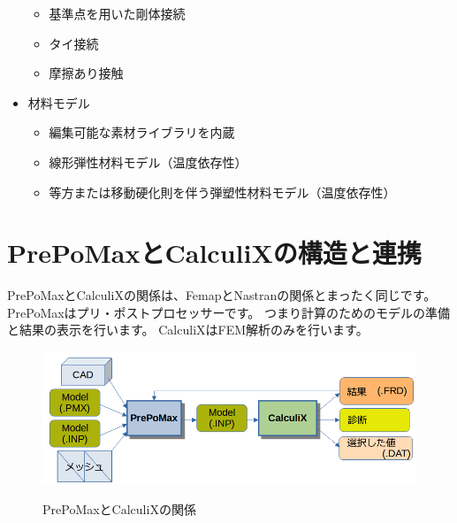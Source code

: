 \documentclass[a4j,20pt,slide]{ltjsarticle}
\begin{document}
\begin{itemize}
\begin{itemize}
		      \item 基準点を用いた剛体接続
		      \item タイ接続
		      \item 摩擦あり接触
	      \end{itemize}
	\item 材料モデル
	      \begin{itemize}
		      \item 編集可能な素材ライブラリを内蔵
		      \item 線形弾性材料モデル（温度依存性）
		      \item 等方または移動硬化則を伴う弾塑性材料モデル（温度依存性）
	      \end{itemize}
\end{itemize}
\section{PrePoMaxとCalculiXの構造と連携}
PrePoMaxとCalculiXの関係は、FemapとNastranの関係とまったく同じです。
PrePoMaxはプリ・ポストプロセッサーです。
つまり計算のためのモデルの準備と結果の表示を行います。
CalculiXはFEM解析のみを行います。
\begin{figure}[H]
	\centering
	\caption{PrePoMaxとCalculiXの関係}
	\includegraphics[width=.8\columnwidth]{fig/PrePoMax2CalculiX.png}
	\label{fig:019}
\end{figure}
\end{document}
